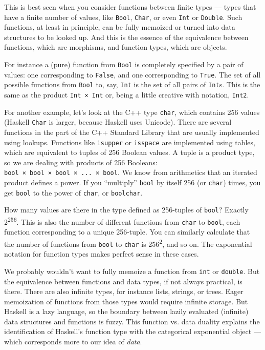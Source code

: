 This is best seen when you consider functions between finite types ---
types that have a finite number of values, like \texttt{Bool},
\texttt{Char}, or even \texttt{Int} or \texttt{Double}. Such functions,
at least in principle, can be fully memoized or turned into data
structures to be looked up. And this is the essence of the equivalence
between functions, which are morphisms, and function types, which are
objects.

For instance a (pure) function from \texttt{Bool} is completely
specified by a pair of values: one corresponding to \texttt{False}, and
one corresponding to \texttt{True}. The set of all possible functions
from \texttt{Bool} to, say, \texttt{Int} is the set of all pairs of
\texttt{Int}s. This is the same as the product \texttt{Int\ ×\ Int} or,
being a little creative with notation, \texttt{Int2}.

For another example, let's look at the C++ type \texttt{char}, which
contains 256 values (Haskell \texttt{Char} is larger, because Haskell
uses Unicode). There are several functions in the \texttt{} part of the
C++ Standard Library that are usually implemented using lookups.
Functions like \texttt{isupper} or \texttt{isspace} are implemented
using tables, which are equivalent to tuples of 256 Boolean values. A
tuple is a product type, so we are dealing with products of 256
Booleans: \texttt{bool\ ×\ bool\ ×\ bool\ ×\ ...\ ×\ bool}. We know from
arithmetics that an iterated product defines a power. If you
``multiply'' \texttt{bool} by itself 256 (or \texttt{char}) times, you
get \texttt{bool} to the power of \texttt{char}, or \texttt{boolchar}.

How many values are there in the type defined as 256-tuples of
\texttt{bool}? Exactly 2\textsuperscript{256}. This is also the number
of different functions from \texttt{char} to \texttt{bool}, each
function corresponding to a unique 256-tuple. You can similarly
calculate that the number of functions from \texttt{bool} to
\texttt{char} is 256\textsuperscript{2}, and so on. The exponential
notation for function types makes perfect sense in these cases.

We probably wouldn't want to fully memoize a function from \texttt{int}
or \texttt{double}. But the equivalence between functions and data
types, if not always practical, is there. There are also infinite types,
for instance lists, strings, or trees. Eager memoization of functions
from those types would require infinite storage. But Haskell is a lazy
language, so the boundary between lazily evaluated (infinite) data
structures and functions is fuzzy. This function vs. data duality
explains the identification of Haskell's function type with the
categorical exponential object --- which corresponds more to our idea of
\emph{data}.

